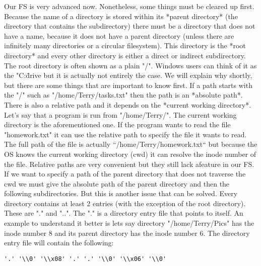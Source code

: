 Our FS is very advanced now. Nonetheless, some things must be cleared up first. Because the name of
a directory is stored within its *parent directory* (the directory that contains the subdirectory)
there must be a directory that does not have a name, because it does not have a parent directory
(unless there are infinitely many directories or a circular filesystem). This directory is the *root
directory* and every other directory is either a direct or indirect subdirectory. The root directory
is often shown as a plain "/". Windows users can think of it as the "C:\" drive but it is actually not
entirely the case. We will explain why shortly, but there are some things that are important to know
first. If a path starts with the "/" such as "/home/Terry/tasks.txt" then the path is an *absolute
path*. There is also a relative path and it depends on the *current working directory*. Let's say that
a program is run from "/home/Terry/". The current working directory is the aforementioned one. If the 
program wants to read the file "homework.txt" it can use the relative path to specify the file it
wants to read. The full path of the file is actually “/home/Terry/homework.txt“ but because the OS
knows the current working directory (cwd) it can resolve the inode number of the file. Relative paths
are very convenient but they still lack afeature in our FS. If we want to specify a path of the parent
directory that does not traverse the cwd we must give the absolute path of the parent directory and
then the following subdirectories. But this is another issue that can be solved. Every directory
contains at least 2 entries (with the exception of the root directory). These are "." and "..". The
"." is a directory entry file that points to itself. An example to understand it better is lets say
directory "/home/Terry/Pics" has the inode number 8 and its parent directory has the inode number 6.
The directory entry file will contain the following:
\newline
\begin{lstlisting}
'.' '\\0' '\\x08' '.' '.' '\\0' '\\x06' '\\0'
\end{lstlisting}

